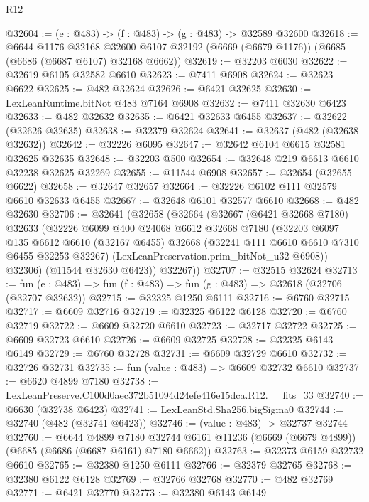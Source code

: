 \begin{lexlean}{R12}
\begin{coremodule}
@32604 := (e : @483) -> (f : @483) -> (g : @483) -> @32589 @32600
@32618 := @6644
    @1176
    @32168
    @32600
    @6107
    @32192
    (@6669 (@6679 @1176))
    (@6685 (@6686 (@6687 @6107) @32168 @6662))
@32619 := @32203 @6030
@32622 := @32619 @6105 @32582 @6610
@32623 := @7411 @6908
@32624 := @32623 @6622
@32625 := @482 @32624
@32626 := @6421 @32625
@32630 := LexLeanRuntime.bitNot @483 @7164 @6908
@32632 := @7411 @32630 @6423
@32633 := @482 @32632
@32635 := @6421 @32633 @6455
@32637 := @32622 (@32626 @32635)
@32638 := @32379 @32624
@32641 := @32637 (@482 (@32638 @32632))
@32642 := @32226 @6095
@32647 := @32642 @6104 @6615 @32581 @32625 @32635
@32648 := @32203 @500
@32654 := @32648 @219 @6613 @6610 @32238 @32625 @32269
@32655 := @11544 @6908
@32657 := @32654 (@32655 @6622)
@32658 := @32647 @32657
@32664 := @32226 @6102 @111 @32579 @6610 @32633 @6455
@32667 := @32648 @6101 @32577 @6610
@32668 := @482 @32630
@32706 := @32641
    (@32658
      (@32664
        (@32667
          (@6421 @32668 @7180)
          @32633
          (@32226
            @6099
            @400
            @24068
            @6612
            @32668
            @7180
            (@32203
              @6097
              @135
              @6612
              @6610
              (@32167 @6455)
              @32668
              (@32241 @111 @6610 @6610 @7310 @6455 @32253 @32267)
              (LexLeanPreservation.prim_bitNot_u32 @6908))
            @32306)
          (@11544 @32630 @6423))
        @32267))
@32707 := @32515 @32624
@32713 := fun (e : @483) => fun (f : @483) => fun (g : @483) => @32618 (@32706 (@32707 @32632))
@32715 := @32325 @1250 @6111
@32716 := @6760 @32715
@32717 := @6609 @32716
@32719 := @32325 @6122 @6128
@32720 := @6760 @32719
@32722 := @6609 @32720 @6610
@32723 := @32717 @32722
@32725 := @6609 @32723 @6610
@32726 := @6609 @32725
@32728 := @32325 @6143 @6149
@32729 := @6760 @32728
@32731 := @6609 @32729 @6610
@32732 := @32726 @32731
@32735 := fun (value : @483) => @6609 @32732 @6610
@32737 := @6620 @4899 @7180
@32738 := LexLeanPreserve.C100d0aec372b51094d24efe416e15dca.R12.__fits_33
@32740 := @6630 (@32738 @6423)
@32741 := LexLeanStd.Sha256.bigSigma0
@32744 := @32740 (@482 (@32741 @6423))
@32746 := (value : @483) -> @32737 @32744
@32760 := @6644
    @4899
    @7180
    @32744
    @6161
    @11236
    (@6669 (@6679 @4899))
    (@6685 (@6686 (@6687 @6161) @7180 @6662))
@32763 := @32373 @6159 @32732 @6610
@32765 := @32380 @1250 @6111
@32766 := @32379 @32765
@32768 := @32380 @6122 @6128
@32769 := @32766 @32768
@32770 := @482 @32769
@32771 := @6421 @32770
@32773 := @32380 @6143 @6149

\end{coremodule}
\end{lexlean}
